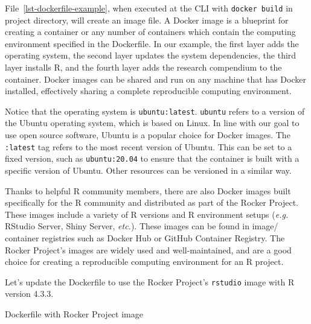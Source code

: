 \documentclass[
  letterpaper,
]{latex/krantz}
\theoremstyle{definition}
\theoremstyle{remark}
\begin{document}
File~\ref{lst-dockerfile-example}, when executed at the CLI with
\texttt{docker\ build} in project directory, will create an image file.
A Docker image is a blueprint for creating a container or any number of
containers which contain the computing environment specified in the
Dockerfile. In our example, the first layer adds the operating system,
the second layer updates the system dependencies, the third layer
installs R, and the fourth layer adds the research compendium to the
container. Docker images can be shared and run on any machine that has
Docker installed, effectively sharing a complete reproducible computing
environment.

Notice that the operating system is \texttt{ubuntu:latest}.
\texttt{ubuntu} refers to a version of the Ubuntu operating system,
which is based on Linux. In line with our goal to use open source
software, Ubuntu is a popular choice for Docker images. The
\texttt{:latest} tag refers to the most recent version of Ubuntu. This
can be set to a fixed version, such as \texttt{ubuntu:20.04} to ensure
that the container is built with a specific version of Ubuntu. Other
resources can be versioned in a similar way.

Thanks to helpful R community members, there are also Docker images
built specifically for the R community and distributed as part of the
Rocker Project. These images include a variety of R versions and R
environment setups (\emph{e.g.} RStudio Server, Shiny Server,
\emph{etc.}). These images can be found in image/ container registries
such as Docker Hub or GitHub Container Registry. The Rocker Project's
images are widely used and well-maintained, and are a good choice for
creating a reproducible computing environment for an R project.

Let's update the Dockerfile to use the Rocker Project's \texttt{rstudio}
image with R version 4.3.3.

\begin{codelisting}

\caption{\label{lst-dockerfile-rstudio}Dockerfile with Rocker Project
image}


\end{codelisting}%
\end{document}
